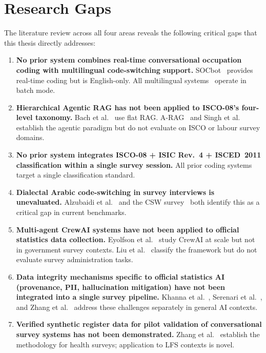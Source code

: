 \section{Research Gaps}
\label{sec:rw-gaps}

The literature review across all four areas reveals the following critical gaps
that this thesis directly addresses:

\begin{enumerate}[label=\textbf{G\arabic*.}, leftmargin=2.5em]
  \item \textbf{No prior system combines real-time conversational occupation
  coding with multilingual code-switching support.}
  SOCbot~\cite{kochar2025socbot} provides real-time coding but is English-only.
  All multilingual systems~\cite{iea2024occupationcoding,anon2025llm4jobs}
  operate in batch mode.

  \item \textbf{Hierarchical Agentic RAG has not been applied to ISCO-08's
  four-level taxonomy.}
  Bach et al.~\cite{bach2025rag} use flat RAG.
  A-RAG~\cite{arag2026hierarchical} and Singh et al.~\cite{singh2025agentic}
  establish the agentic paradigm but do not evaluate on ISCO or labour survey
  domains.

  \item \textbf{No prior system integrates ISCO-08 + ISIC Rev.~4 + ISCED~2011
  classification within a single survey session.}
  All prior coding systems target a single classification standard.

  \item \textbf{Dialectal Arabic code-switching in survey interviews is
  unevaluated.}
  Alzubaidi et al.~\cite{alzubaidi2025arabic} and the CSW survey~\cite{multiauth2026cswnlp}
  both identify this as a critical gap in current benchmarks.

  \item \textbf{Multi-agent CrewAI systems have not been applied to official
  statistics data collection.}
  Eyolfson et al.~\cite{eyolfson2026mas} study CrewAI at scale but not in
  government survey contexts. Liu et al.~\cite{liu2025agenticai} classify the
  framework but do not evaluate survey administration tasks.

  \item \textbf{Data integrity mechanisms specific to official statistics AI
  (provenance, PII, hallucination mitigation) have not been integrated into
  a single survey pipeline.}
  Khanna et al.~\cite{khanna2025knowledge}, Serenari et al.~\cite{serenari2025lopsided},
  and Zhang et al.~\cite{zhang2025hallucination} address these challenges
  separately in general AI contexts.

  \item \textbf{Verified synthetic register data for pilot validation of
  conversational survey systems has not been demonstrated.}
  Zhang et al.~\cite{zhang2025synthetic} establish the methodology for
  health surveys; application to LFS contexts is novel.
\end{enumerate}

